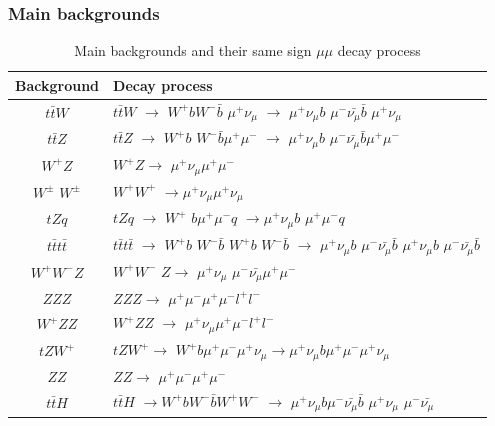 \documentclass[11pt]{beamer}
\begin{document}
\begin{frame}
\frametitle{Main backgrounds}
\tiny
\begin{table}
	\caption{Main backgrounds and their same sign $\mu\mu$ decay process }
\centering
\begin{tabular}{|c|l|}
	\hline
	Background & Decay process \\
	\hline
	$t\bar{t}W$ &$t\bar{t}W$ $\rightarrow$ $W^+ b W^- \bar{b}$ $\mu^+\nu_\mu$ $\rightarrow$ $\mu^+ \nu_\mu b$ $\mu^- \bar{\nu_\mu} \bar{b}$ $\mu^+ \nu_\mu$\\
	\hline
	$t\bar{t} Z$ & $t\bar{t} Z$ $\rightarrow$ $W^+ b$ $W^-\bar{b} \mu^+ \mu^-$ $\rightarrow$ $\mu^+ \nu_\mu b$ $\mu^- \bar{\nu_\mu} \bar{b}\mu^+ \mu^-$ \\
	\hline
	$W^+ Z$ &$W^+ Z \rightarrow$ $\mu^+ \nu_\mu \mu^+ \mu^-$ \\
	\hline 
	$W^\pm$ $W^\pm$ & $W^+W^+$ $\rightarrow$$\mu^+\nu_\mu$$\mu^+ {\nu_\mu}$ \\
	\hline 
	$tZq$ & $tZq$ $\rightarrow$ $W^+$ $ b\mu^+ \mu^- q$ $\rightarrow$$\mu^+ \nu_\mu b$ $\mu^+\mu^- q$ \\
	\hline 
	$t\bar{t}t\bar{t}$ &$t\bar{t}t\bar{t}$ $\rightarrow$ $W^+ b$ $W^- \bar{b}$ $W^+ b$ $W^- \bar{b}$ $\rightarrow$ $\mu^+ \nu_\mu b$ $\mu^- \bar{\nu_\mu} \bar{b}$ $\mu^+ \nu_\mu b$ $\mu^- \bar{\nu_\mu} \bar{b}$ \\
	\hline 
	$W^+ W^- Z$ & $W^+ W^-$ $Z \rightarrow$ $\mu^+ \nu_\mu$ $\mu^- \bar{\nu_\mu} \mu^+ \mu^-$\\
	\hline 
	$ZZZ$ & $ZZZ \rightarrow$ $\mu^+ \mu^-\mu^+ \mu^-l^+ l^-$ \\
	\hline 
	$W^+ZZ$ &$W^+ZZ$ $\rightarrow$ $\mu^+ \nu_\mu \mu^+ \mu^- l^+l^-$ \\
	\hline 
	$tZW^+$ & $tZW^+ \rightarrow$ $W^+b \mu^+ \mu^- \mu^+ \nu_\mu \rightarrow \mu^+ \nu_\mu b \mu^+ \mu^- \mu^+ \nu_\mu$\\
	\hline
	$ZZ$ & $ZZ\rightarrow$ $\mu^+ \mu^- \mu^+ \mu^-$ \\
	\hline
	$t\bar{t}H$	& $t\bar{t}H$ $\rightarrow W^+b W^- \bar{b} W^+W^-$ $\rightarrow$ $\mu^+ \nu_\mu b$$\mu^- \bar{\nu_\mu}\bar{b}$ $\mu^+\nu_\mu$ $\mu^-\bar{\nu_\mu}$\\
	\hline 
\end{tabular}
\label{back}
\end{table} 
\end{frame}
\end{document}
